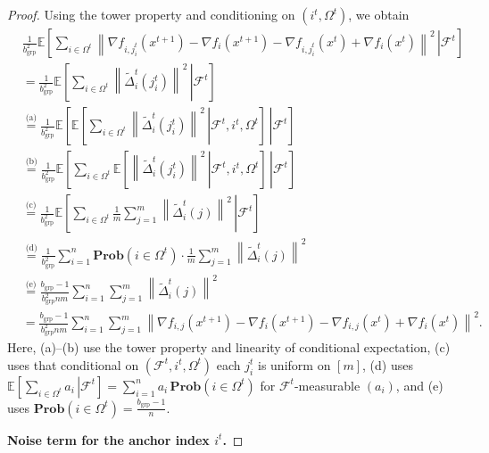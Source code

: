 \documentclass{article}
\newcommand{\eqtext}[1]{\ensuremath{\stackrel{\text{#1}}{=}}}
\newcommand{\sqn}[1]{\left\| #1 \right\|^2}
\newcommand{\Prob}{\mathbf{Prob}}
\newcommand{\Expb}[2]{\mathbb{E}\!\left[\left. #1\,\right|#2 \right]}
\newcommand{\Expc}[1]{\Expb{#1}{\mathcal{F}^t}}
\theoremstyle{plain}
\begin{document}
\begin{proof}
Using the tower property and conditioning on $(i^t,\Omega^t)$, we obtain
\begin{align*}
&\frac{1}{b_{\mathrm{grp}}^2}\Expc{ \sum_{i\in \Omega^t}\sqn{ \nabla f_{i,j_i^t}(x^{t+1})-\nabla f_i(x^{t+1})-\nabla f_{i,j_i^t}(x^{t})+\nabla f_i(x^t)}}\\
&=\frac{1}{b_{\mathrm{grp}}^2}\Expc{\sum_{i\in\Omega^t}\sqn{\widetilde{\Delta}_i^t(j_i^t)}}\\
&\eqtext{(a)}\frac{1}{b_{\mathrm{grp}}^2}\Expb{\Expb{\sum_{i\in\Omega^t}\sqn{\widetilde{\Delta}_i^t(j_i^t)}}{\mathcal{F}^t,i^t,\Omega^t}}{\mathcal{F}^t}\\
&\eqtext{(b)}\frac{1}{b_{\mathrm{grp}}^2}\Expb{\sum_{i\in\Omega^t}\Expb{\sqn{\widetilde{\Delta}_i^t(j_i^t)}}{\mathcal{F}^t,i^t,\Omega^t}}{\mathcal{F}^t}\\
&\eqtext{(c)}\frac{1}{b_{\mathrm{grp}}^2}\Expb{\sum_{i\in\Omega^t}\frac{1}{m}\sum_{j=1}^m \sqn{\widetilde{\Delta}_i^t(j)}}{\mathcal{F}^t}\\
&\eqtext{(d)}\frac{1}{b_{\mathrm{grp}}^2}\sum_{i=1}^n \Prob(i\in\Omega^t)\cdot \frac{1}{m}\sum_{j=1}^m \sqn{\widetilde{\Delta}_i^t(j)}\\
&\eqtext{(e)}\frac{b_{\mathrm{grp}}-1}{b_{\mathrm{grp}}^2nm}\sum_{i=1}^n\sum_{j=1}^m \sqn{\widetilde{\Delta}_i^t(j)}\\
&=\frac{b_{\mathrm{grp}}-1}{b_{\mathrm{grp}}^2nm}\sum_{i=1}^n\sum_{j=1}^m
\sqn{\nabla f_{i,j}(x^{t+1})-\nabla f_i(x^{t+1})-\nabla f_{i,j}(x^{t})+\nabla f_i(x^{t})}.
\end{align*}
Here, (a)--(b) use the tower property and linearity of conditional expectation, (c) uses that conditional on
$(\mathcal{F}^t,i^t,\Omega^t)$ each $j_i^t$ is uniform on $[m]$, (d) uses
$\Expb{\sum_{i\in\Omega^t}a_i}{\mathcal{F}^t}=\sum_{i=1}^n a_i\,\Prob(i\in\Omega^t)$ for $\mathcal{F}^t$-measurable $(a_i)$,
and (e) uses $\Prob(i\in\Omega^t)=\frac{b_{\mathrm{grp}}-1}{n}$.

\textbf{Noise term for the anchor index $i^t$.}


\end{proof}
\end{document}
